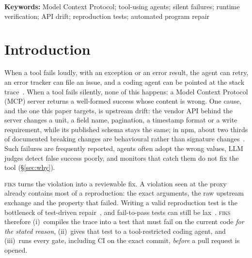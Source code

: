 \documentclass[10pt]{article}
\newcommand{\fiks}{\textsc{fiks}}
\begin{document}
\noindent\textbf{Keywords:} Model Context Protocol; tool-using agents; silent failures; runtime verification; API drift; reproduction tests; automated program repair

\section{Introduction}
\label{sec:intro}

When a tool fails loudly, with an exception or an error result, the agent can retry, an error tracker can file an issue, and a coding agent can be pointed at the stack trace~\cite{sentry-seer-issue-fix,devin-oncall}.
When a tool fails silently, none of this happens: a Model Context Protocol (MCP) server returns a well-formed success whose content is wrong.
One cause, and the one this paper targets, is upstream drift: the vendor API behind the server changes a unit, a field name, pagination, a timestamp format or a write requirement, while its published schema stays the same; in npm, about two thirds of documented breaking changes are behavioural rather than signature changes~\cite{kong2025npm}.
Such failures are frequently reported, agents often adopt the wrong values, LLM judges detect false success poorly, and monitors that catch them do not fix the tool (\S\ref{sec:why}).

\fiks{} turns the violation into a reviewable fix.
A violation seen at the proxy already contains most of a reproduction: the exact arguments, the raw upstream exchange and the property that failed.
Writing a valid reproduction test is the bottleneck of test-driven repair~\cite{tdflow}, and fail-to-pass tests can still be lax~\cite{tan2026coharden}.
\fiks{} therefore (i)~compiles the trace into a test that must fail on the current code \emph{for the stated reason}, (ii)~gives that test to a tool-restricted coding agent, and (iii)~runs every gate, including CI on the exact commit, \emph{before} a pull request is opened.
\end{document}
